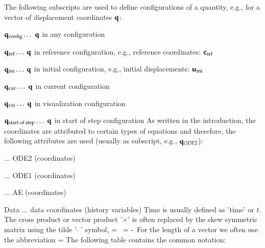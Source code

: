 %
The following subscripts are used to define configurations of a quantity, e.g., for a vector of displacement coordinates $\mathbf{q}$:
\bi
  \item $\mathbf{q}_\mathrm{config} \ldots$ $\mathbf{q}$ in any configuration
  \item $\mathbf{q}_\mathrm{ref} \ldots$ $\mathbf{q}$ in reference configuration, e.g., reference coordinates: $\mathbf{c}_\mathrm{ref}$
  \item $\mathbf{q}_\mathrm{ini} \ldots$ $\mathbf{q}$ in initial configuration, e.g., initial displacements: $\mathbf{u}_\mathrm{ini}$
  \item $\mathbf{q}_\mathrm{cur} \ldots$ $\mathbf{q}$ in current configuration
  \item $\mathbf{q}_\mathrm{vis} \ldots$ $\mathbf{q}$ in visualization configuration
  \item $\mathbf{q}_\mathrm{start\;of\;step} \ldots$ $\mathbf{q}$ in start of step configuration
\ei
As written in the introduction, the coordinates are attributed to certain types of equations and therefore, the following attributes are used (usually as subscript, e.g., $\mathbf{q}_{ODE2}$):
\bi
  \item {} $\ldots$ \acl{ODE2} (coordinates)
  \item {} $\ldots$ \acl{ODE1} (coordinates)
  \item {} $\ldots$ \acl{AE} (coordinates)
  \item Data $\ldots$ data coordinates (history variables)
\ei
Time is usually defined as 'time' or $t$.
The cross product or vector product '$\times$' is often replaced by the skew symmetric matrix using the tilde '$\tilde{\;\;}$' symbol,
\be
  \av \times \bv = \tilde \av \, \bv = -\tilde \bv \, \av \eqDot
\ee
For the length of a vector we often use the abbreviation 
\be \label{eq:definition:length}
  \Vert \av \Vert =  \eqDot
\ee
%
\label{sec:symbolsItems}
\noindent The following table contains the common notation: \vspace{-12pt}
